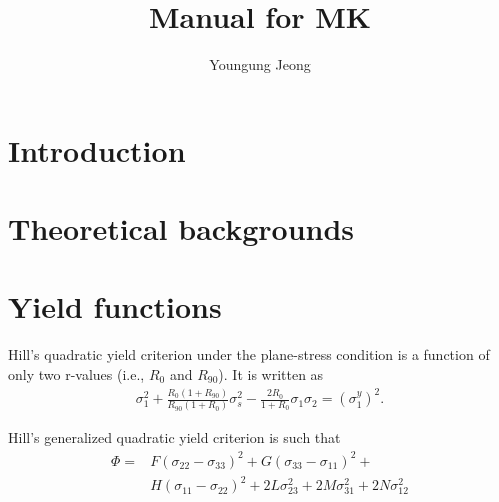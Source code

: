 \documentclass[12pt]{amsart}
\author{Youngung Jeong}
\title{Manual for MK}
\begin{document}
\newpage
\maketitle
\newpage
\setcounter{tocdepth}{1}
\tableofcontents
\section{Introduction}
\label{sec:intro}

\section{Theoretical backgrounds}
\label{sec:theory}




\section{Yield functions}
\label{sec:yieldfunctions}
Hill's quadratic yield criterion under the plane-stress condition is a function of only two r-values (i.e., $R_0$ and $R_90$).
It is written as
\begin{eqnarray}
  \label{eq:hillquad}
  \sigma_{1}^2 + \frac{R_0 (1 + R_{90})}{R_{90}(1+R_0)}\sigma_s^2-\frac{2R_0}{1+R_0}\sigma_1\sigma_2=(\sigma_1^y)^2.  
\end{eqnarray}


Hill's generalized quadratic yield criterion is such that
\begin{equation}
  \label{eq:hillgenquad}
  \begin{aligned}
    \Phi =& F(\sigma_{22}-\sigma_{33})^2+G(\sigma_{33}-\sigma_{11})^2+\\
          &H(\sigma_{11}-\sigma_{22})^2+2L\sigma_{23}^2+2M\sigma_{31}^2+2N\sigma_{12}^2
  \end{aligned}
\end{equation}
\end{document}
